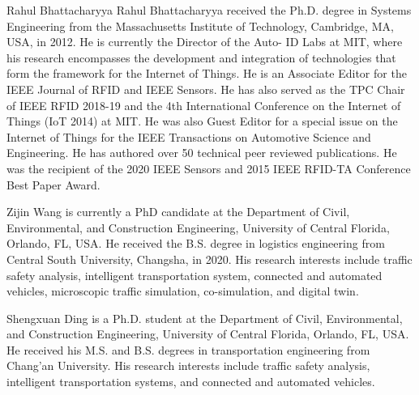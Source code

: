 \documentclass[lettersize,journal]{IEEEtran}
\begin{document}
\begin{IEEEbiography}{Rahul Bhattacharyya} Rahul Bhattacharyya received the Ph.D.
degree in Systems Engineering from the
Massachusetts Institute of Technology,
Cambridge, MA, USA, in 2012. He is
currently the Director of the Auto-
ID Labs at MIT, where his research
encompasses the development and
integration of technologies that form the
framework for the Internet of Things. He is an
Associate Editor for the IEEE Journal of RFID and IEEE Sensors.
He has also served as the TPC Chair of
IEEE RFID 2018-19 and the 4th International Conference on the
Internet of Things (IoT 2014) at MIT. He was also Guest Editor for a
special issue on the Internet of Things for the IEEE Transactions on
Automotive Science and Engineering. He has authored over 50
technical peer reviewed publications. He was the recipient of the 2020
IEEE Sensors and 2015 IEEE RFID-TA Conference Best Paper
Award.
\end{IEEEbiography}

\vspace{11pt}

\begin{IEEEbiography}{Zijin Wang} is currently a PhD candidate at the Department of Civil, Environmental, and Construction Engineering, University of Central Florida, Orlando, FL, USA. He received the B.S. degree in logistics engineering from Central South University, Changsha, in 2020. His research interests include traffic safety analysis, intelligent transportation system, connected and automated vehicles, microscopic traffic simulation, co-simulation, and digital twin.
\end{IEEEbiography}

\vspace{11pt}

\begin{IEEEbiography}{Shengxuan Ding} is a Ph.D. student at the Department of Civil, Environmental, and Construction Engineering, University of Central Florida, Orlando, FL, USA. He received his M.S. and B.S. degrees in
transportation engineering from Chang'an University. His research interests include traffic safety analysis, intelligent transportation systems, and connected and automated vehicles.
\end{IEEEbiography}
\end{document}
